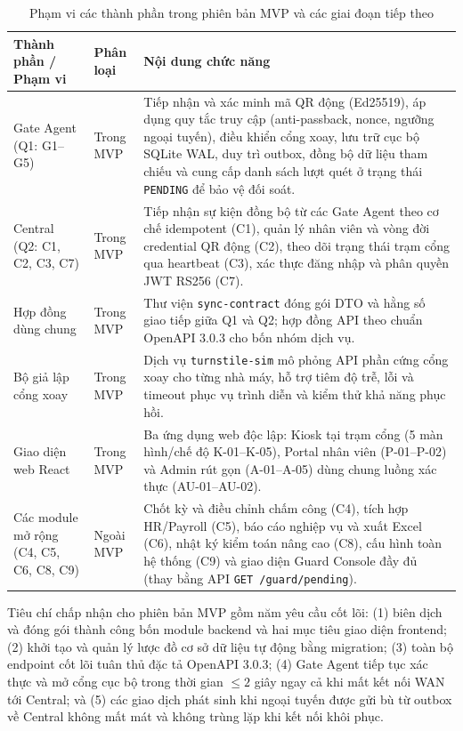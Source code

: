 \begin{table}[H]
\centering
\caption{Phạm vi các thành phần trong phiên bản MVP và các giai đoạn tiếp theo}
\label{tab:mvp-implementation-scope}
\small
\renewcommand{\arraystretch}{1.25}
\begin{tabularx}{\textwidth}{|>{\raggedright\arraybackslash}p{3.4cm}|>{\raggedright\arraybackslash}p{2.3cm}|>{\raggedright\arraybackslash}X|}
\hline
\textbf{Thành phần / Phạm vi} & \textbf{Phân loại} & \textbf{Nội dung chức năng} \\
\hline
Gate Agent (Q1: G1--G5) & Trong MVP & Tiếp nhận và xác minh mã QR động (Ed25519), áp dụng quy tắc truy cập (anti-passback, nonce, ngưỡng ngoại tuyến), điều khiển cổng xoay, lưu trữ cục bộ SQLite WAL, duy trì outbox, đồng bộ dữ liệu tham chiếu và cung cấp danh sách lượt quét ở trạng thái \texttt{PENDING} để bảo vệ đối soát. \\
\hline
Central (Q2: C1, C2, C3, C7) & Trong MVP & Tiếp nhận sự kiện đồng bộ từ các Gate Agent theo cơ chế idempotent (C1), quản lý nhân viên và vòng đời credential QR động (C2), theo dõi trạng thái trạm cổng qua heartbeat (C3), xác thực đăng nhập và phân quyền JWT RS256 (C7). \\
\hline
Hợp đồng dùng chung & Trong MVP & Thư viện \texttt{sync-contract} đóng gói DTO và hằng số giao tiếp giữa Q1 và Q2; hợp đồng API theo chuẩn OpenAPI 3.0.3 cho bốn nhóm dịch vụ. \\
\hline
Bộ giả lập cổng xoay & Trong MVP & Dịch vụ \texttt{turnstile-sim} mô phỏng API phần cứng cổng xoay cho từng nhà máy, hỗ trợ tiêm độ trễ, lỗi và timeout phục vụ trình diễn và kiểm thử khả năng phục hồi. \\
\hline
Giao diện web React & Trong MVP & Ba ứng dụng web độc lập: Kiosk tại trạm cổng (5 màn hình/chế độ K-01--K-05), Portal nhân viên (P-01--P-02) và Admin rút gọn (A-01--A-05) dùng chung luồng xác thực (AU-01--AU-02). \\
\hline
Các module mở rộng (C4, C5, C6, C8, C9) & Ngoài MVP & Chốt kỳ và điều chỉnh chấm công (C4), tích hợp HR/Payroll (C5), báo cáo nghiệp vụ và xuất Excel (C6), nhật ký kiểm toán nâng cao (C8), cấu hình toàn hệ thống (C9) và giao diện Guard Console đầy đủ (thay bằng API \texttt{GET /guard/pending}). \\
\hline
\end{tabularx}
\end{table}

Tiêu chí chấp nhận cho phiên bản MVP gồm năm yêu cầu cốt lõi: (1) biên dịch và đóng gói thành công
bốn module backend và hai mục tiêu giao diện frontend; (2) khởi tạo và quản lý lược đồ cơ sở dữ liệu
tự động bằng migration; (3) toàn bộ endpoint cốt lõi tuân thủ đặc tả OpenAPI 3.0.3; (4) Gate Agent
tiếp tục xác thực và mở cổng cục bộ trong thời gian $\leq 2$ giây ngay cả khi mất kết nối WAN tới
Central; và (5) các giao dịch phát sinh khi ngoại tuyến được gửi bù từ outbox về Central không mất
mát và không trùng lặp khi kết nối khôi phục.

